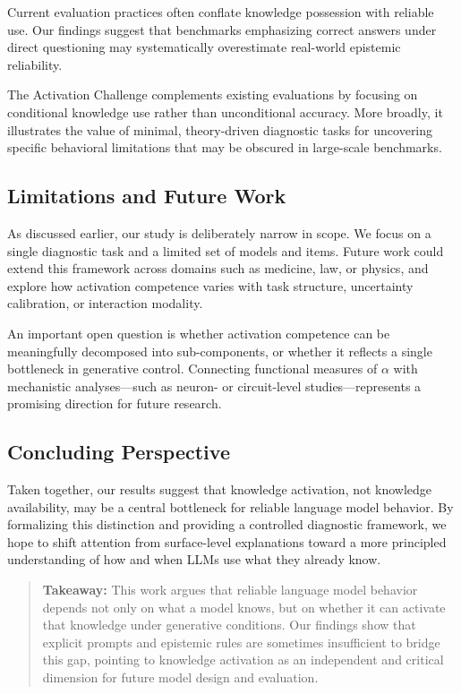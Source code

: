 Current evaluation practices often conflate knowledge possession with reliable use. Our findings suggest that benchmarks emphasizing correct answers under direct questioning may systematically overestimate real-world epistemic reliability.

The Activation Challenge complements existing evaluations by focusing on conditional knowledge use rather than unconditional accuracy. More broadly, it illustrates the value of minimal, theory-driven diagnostic tasks for uncovering specific behavioral limitations that may be obscured in large-scale benchmarks.


\subsection{Limitations and Future Work}

As discussed earlier, our study is deliberately narrow in scope. We focus on a single diagnostic task and a limited set of models and items. Future work could extend this framework across domains such as medicine, law, or physics, and explore how activation competence varies with task structure, uncertainty calibration, or interaction modality.

An important open question is whether activation competence can be meaningfully decomposed into sub-components, or whether it reflects a single bottleneck in generative control. Connecting functional measures of $\alpha$ with mechanistic analyses---such as neuron- or circuit-level studies---represents a promising direction for future research.


\subsection{Concluding Perspective}

Taken together, our results suggest that knowledge activation, not knowledge availability, may be a central bottleneck for reliable language model behavior. By formalizing this distinction and providing a controlled diagnostic framework, we hope to shift attention from surface-level explanations toward a more principled understanding of how and when LLMs use what they already know.



\begin{quote}
\textbf{Takeaway:} This work argues that reliable language model behavior depends not only on what a model knows, but on whether it can activate that knowledge under generative conditions. Our findings show that explicit prompts and epistemic rules are sometimes insufficient to bridge this gap, pointing to knowledge activation as an independent and critical dimension for future model design and evaluation.
\end{quote}


